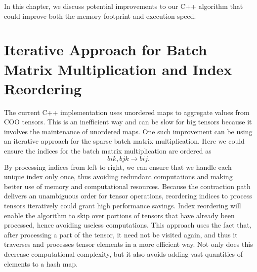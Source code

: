 In this chapter, we discuss potential improvements to our C++ algorithm that could
improve both the memory footprint and execution speed.

\section{Iterative Approach for Batch Matrix Multiplication and Index Reordering}
The current C++ implementation uses unordered maps to aggregate values from COO tensors.
This is an inefficient way and can be slow for big tensors because it involves the
maintenance of unordered maps. One such improvement can be using an iterative approach
for the sparse batch matrix multiplication. Here we could ensure the indices for the batch
matrix multiplication are ordered as
\begin{equation*}
    bik, bjk \rightarrow bij.
\end{equation*}
By processing indices from left to right, we can ensure that we handle each unique index
only once, thus avoiding redundant computations and making better use of memory and
computational resources. Because the contraction path delivers an unambiguous order for
tensor operations, reordering indices to process tensors iteratively could grant high
performance savings. Index reordering will enable the algorithm to skip over portions
of tensors that have already been processed, hence avoiding useless computations. This
approach uses the fact that, after processing a part of the tensor, it need not be visited
again, and thus it traverses and processes tensor elements in a more efficient way. Not
only does this decrease computational complexity, but it also avoids adding vast quantities
of elements to a hash map.

